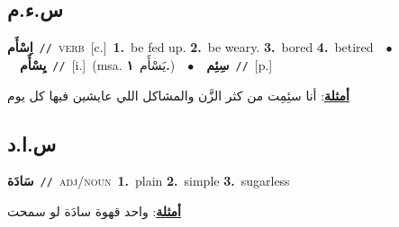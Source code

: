 \documentclass[10pt,a4paper,twoside]{article} %
\begin{document}
\begin{multicols}{2}
\vspace{-3mm}
\subsection*{\color{blue}\foreignlanguage{arabic}{س.ء.م}\color{blue}{}} 

{\setlength\topsep{0pt}\textbf{\foreignlanguage{arabic}{اِسْأَم}}\ {\color{gray}\texttt{//}\color{black}}\ \textsc{verb}\ [c.]\ \textbf{1.}~be fed up.  \textbf{2.}~be weary.  \textbf{3.}~bored  \textbf{4.}~betired\ \ $\bullet$\ \ \setlength\topsep{0pt}\textbf{\foreignlanguage{arabic}{يِسْأَم}}\ {\color{gray}\texttt{//}\color{black}}\ [i.]\ \color{gray}(msa. \foreignlanguage{arabic}{يَسْأَم}~\foreignlanguage{arabic}{\textbf{١.}})\color{black}\ \ $\bullet$\ \ \setlength\topsep{0pt}\textbf{\foreignlanguage{arabic}{سِئِم}}\ {\color{gray}\texttt{//}\color{black}}\ [p.]\  \begin{flushright}\color{gray}\foreignlanguage{arabic}{\textbf{\underline{\foreignlanguage{arabic}{أمثلة}}}: أنا سئِمِت من كثر الزَّن والمشاكل اللي عايشين فيها كل يوم}\end{flushright}\color{black}} \vspace{2mm}

\vspace{-3mm}
\subsection*{\color{blue}\foreignlanguage{arabic}{س.ا.د}\color{blue}{ (ntws)}} 

{\setlength\topsep{0pt}\textbf{\foreignlanguage{arabic}{سَادَة}}\ {\color{gray}\texttt{//}\color{black}}\ \textsc{adj/noun}\ \textbf{1.}~plain  \textbf{2.}~simple  \textbf{3.}~sugarless\  \begin{flushright}\color{gray}\foreignlanguage{arabic}{\textbf{\underline{\foreignlanguage{arabic}{أمثلة}}}: واحد قهوة سادَة لو سمحت}\end{flushright}\color{black}} \vspace{2mm}


\end{multicols}
\end{document}
